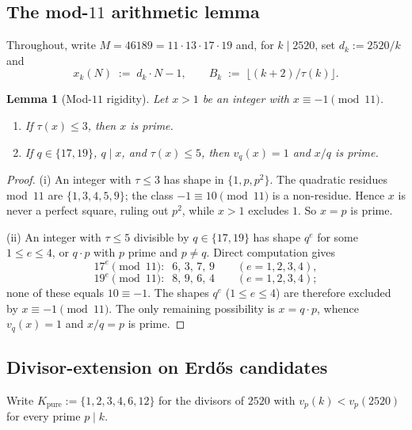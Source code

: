 \documentclass[11pt]{article}
\renewcommand{\_}{\origunderscore\allowbreak}
\newtheorem{lemma}[theorem]{Lemma}
\theoremstyle{definition}
\theoremstyle{remark}
\begin{document}
\subsection{The mod-$11$ arithmetic lemma}

Throughout, write $M=46189=11\cdot 13\cdot 17\cdot 19$ and, for
$k\mid 2520$, set $d_k := 2520/k$ and
\[
  x_k(N) \;:=\; d_k\cdot N - 1,
  \qquad
  B_k \;:=\; \bigl\lfloor (k+2)/\tau(k) \bigr\rfloor.
\]

\begin{lemma}[Mod-$11$ rigidity]\label{lem:mod11}
Let $x>1$ be an integer with $x\equiv -1\pmod{11}$.
\begin{enumerate}
\item If $\tau(x)\le 3$, then $x$ is prime.
\item If $q\in\{17,19\}$, $q\mid x$, and $\tau(x)\le 5$, then
$v_q(x)=1$ and $x/q$ is prime.
\end{enumerate}
\end{lemma}

\begin{proof}
(i) An integer with $\tau\le 3$ has shape in $\{1,p,p^2\}$. The
quadratic residues mod~$11$ are $\{1,3,4,5,9\}$; the class
$-1\equiv 10\pmod{11}$ is a non-residue. Hence $x$ is never a
perfect square, ruling out $p^2$, while $x>1$ excludes $1$. So
$x=p$ is prime.

(ii) An integer with $\tau\le 5$ divisible by $q\in\{17,19\}$ has
shape $q^e$ for some $1\le e\le 4$, or $q\cdot p$ with $p$ prime and
$p\ne q$. Direct computation gives
\[
  17^e \pmod{11}:\;\; 6,\,3,\,7,\,9 \qquad (e=1,2,3,4),
\]
\[
  19^e \pmod{11}:\;\; 8,\,9,\,6,\,4 \qquad (e=1,2,3,4);
\]
none of these equals $10\equiv -1$. The shapes $q^e$ ($1\le e\le 4$)
are therefore excluded by $x\equiv -1\pmod{11}$. The only remaining
possibility is $x=q\cdot p$, whence $v_q(x)=1$ and $x/q=p$ is prime.
\end{proof}

\subsection{Divisor-extension on Erd\H{o}s candidates}

Write $K_{\text{pure}}:=\{1,2,3,4,6,12\}$ for the divisors of $2520$
with $v_p(k)<v_p(2520)$ for every prime $p\mid k$.
\end{document}
